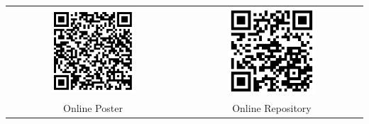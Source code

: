 \documentclass[a4]{sciposter}
\begin{document}
\begin{multicols}{3}
{\tiny }

\begin{table}
	\centering
	\begin{tabular}{c c}
		\includegraphics[width=0.5\textwidth]{qrcode.png} & \includegraphics[width=0.5\textwidth]{qrcode_repo.png} \\
		Online Poster & Online Repository
	\end{tabular}
\end{table}

\end{multicols}
\end{document}
